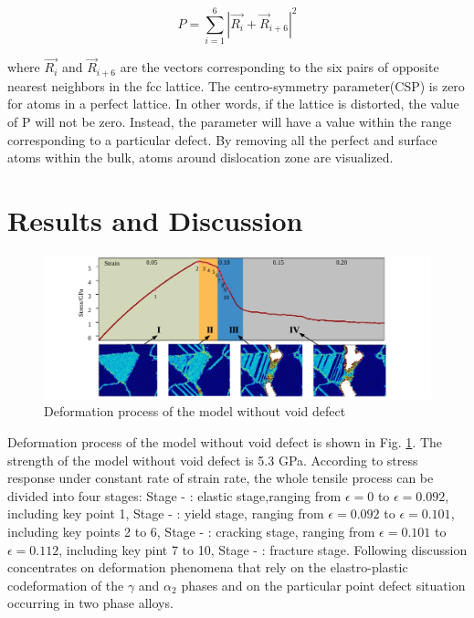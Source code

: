 \documentclass[metals,article,submit,moreauthors,pdftex,10pt,a4paper]{Definitions/mdpi}
\begin{document}
	\begin{equation} \label{eq:csp} 
	P = \displaystyle\sum_{i=1}^{6}|\vec{R_i}+{\vec{R}}_{i+6}|^2
	\end{equation}
	
where $\vec{R_i}$ and ${\vec{R}}_{i+6}$ are the vectors corresponding to the six pairs of opposite nearest neighbors in the fcc lattice. The centro-symmetry parameter(CSP) is zero for atoms in a perfect lattice. In other words, if the lattice is distorted, the value of P will not be zero. Instead, the parameter will have a value within the range corresponding to a particular defect. By removing all the perfect and surface atoms within the bulk, atoms around dislocation zone are visualized. 
 
\section{Results and Discussion}\label{section:RD}

\begin{figure}[ht]
	\centering
	\includegraphics[width=1\linewidth]{img/tens}
	\caption{Deformation process of the model without void defect}
	\label{fig:deformation-pf}
\end{figure}


Deformation process of the model without void defect is shown in Fig. \ref{fig:deformation-pf}. The strength of the model without void defect is 5.3 GPa. According to stress response under constant rate of strain rate, the whole tensile process can be divided into four stages: 
Stage - \uppercase\expandafter{}: elastic stage,ranging from $\epsilon = 0$ to $\epsilon = 0.092$, including key point 1,
Stage - \uppercase\expandafter{}: yield stage, ranging from $\epsilon = 0.092$ to $\epsilon = 0.101$, including key points 2 to 6,
Stage - \uppercase\expandafter{}: cracking stage, ranging from $\epsilon = 0.101$ to $\epsilon = 0.112$, including key pint 7 to 10,
Stage - \uppercase\expandafter{}: fracture stage. Following discussion concentrates on deformation phenomena that rely on the elastro-plastic codeformation of the $\gamma$ and $\alpha_2$ phases and on the particular point defect situation occurring in two phase alloys. 
\end{document}

